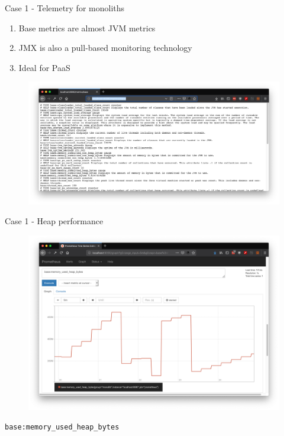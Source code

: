 \documentclass{beamer}
\begin{document}




\begin{frame}{Case 1 - Telemetry for monoliths}

\begin{enumerate}
	\item Base metrics are almost JVM metrics
	\item JMX is also a pull-based monitoring technology
	\item Ideal for PaaS
\end{enumerate}

\begin{figure}
	\centering
	\includegraphics[width=\linewidth]{Images/base-metrics}
\end{figure}



\end{frame}

\begin{frame}{Case 1 - Heap performance}

\begin{figure}
	\centering
	\includegraphics[width=0.8\linewidth]{Images/mono1}
\end{figure}
\lstinline|base:memory_used_heap_bytes|
\end{frame}
\end{document}
